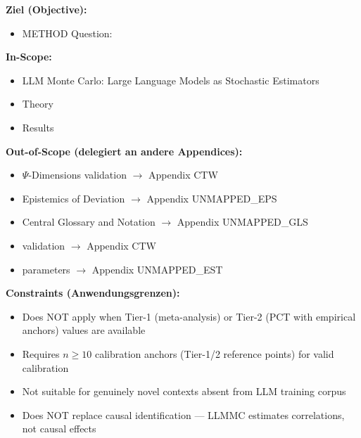 

%
\begin{tcolorbox}[
    colback=orange!5!white,
    colframe=orange!75!black,
    title={\textbf{Appendix Scope: Ziel / In-Scope / Out-of-Scope / Constraints}},
    fonttitle=\bfseries
]

\textbf{Ziel (Objective):}
\begin{itemize}[nosep]
    \item METHOD Question:
\end{itemize}

\textbf{In-Scope:}
\begin{itemize}[nosep]
    \item LLM Monte Carlo: Large Language Models as Stochastic Estimators
    \item Theory
    \item Results
\end{itemize}

\textbf{Out-of-Scope (delegiert an andere Appendices):}
\begin{itemize}[nosep]
    \item $\Psi$-Dimensions validation $\rightarrow$ Appendix CTW
    \item Epistemics of Deviation $\rightarrow$ Appendix UNMAPPED_EPS
    \item Central Glossary and Notation $\rightarrow$ Appendix UNMAPPED_GLS
    \item validation $\rightarrow$ Appendix CTW
    \item parameters $\rightarrow$ Appendix UNMAPPED_EST
\end{itemize}

\textbf{Constraints (Anwendungsgrenzen):}
\begin{itemize}[nosep]
    \item Does NOT apply when Tier-1 (meta-analysis) or Tier-2 (PCT with empirical anchors) values are available
    \item Requires $n \geq 10$ calibration anchors (Tier-1/2 reference points) for valid calibration
    \item Not suitable for genuinely novel contexts absent from LLM training corpus
    \item Does NOT replace causal identification --- LLMMC estimates correlations, not causal effects
\end{itemize}


\end{tcolorbox}
